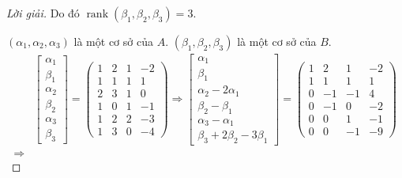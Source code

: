 \begin{proof}[Lời giải]
    Do đó $\operatorname{rank}(\beta_{1}, \beta_{2}, \beta_{3}) = 3$.
    
    $(\alpha_{1}, \alpha_{2}, \alpha_{3})$ là một cơ sở của $A$. $(\beta_{1}, \beta_{2}, \beta_{3})$ là một cơ sở của $B$.
    \begin{align*}
                        & \begin{bmatrix}
                              \alpha_{1} \\
                              \beta_{1}  \\
                              \alpha_{2} \\
                              \beta_{2}  \\
                              \alpha_{3} \\
                              \beta_{3}
                          \end{bmatrix}=
        \begin{pmatrix}
            1 & 2 & 1 & -2 \\
            1 & 1 & 1 & 1  \\
            2 & 3 & 1 & 0  \\
            1 & 0 & 1 & -1 \\
            1 & 2 & 2 & -3 \\
            1 & 3 & 0 & -4
        \end{pmatrix}
        \Longrightarrow
        \begin{bmatrix}
            \alpha_{1}               \\
            \beta_{1}                \\
            \alpha_{2} - 2\alpha_{1} \\
            \beta_{2} - \beta_{1}    \\
            \alpha_{3} - \alpha_{1}  \\
            \beta_{3} + 2\beta_{2} - 3\beta_{1}
        \end{bmatrix}=
        \begin{pmatrix}
            1 & 2  & 1  & -2 \\
            1 & 1  & 1  & 1  \\
            0 & -1 & -1 & 4  \\
            0 & -1 & 0  & -2 \\
            0 & 0  & 1  & -1 \\
            0 & 0  & -1 & -9
        \end{pmatrix}                 \\
        \Longrightarrow &

\end{align*}
\end{proof}

